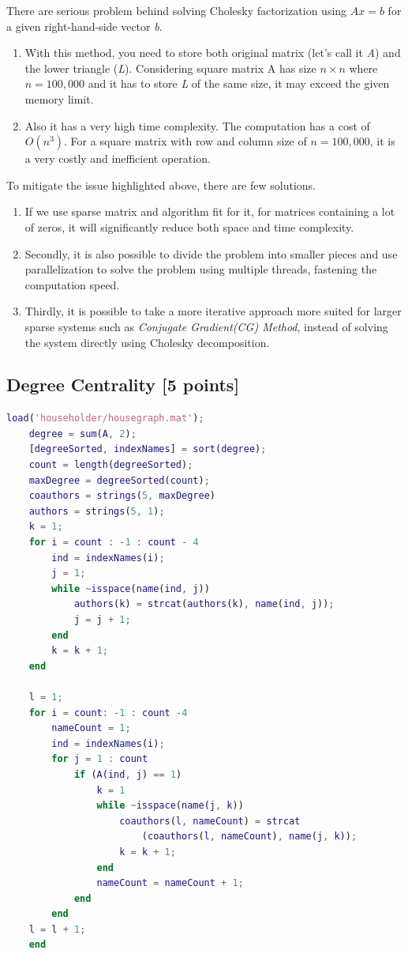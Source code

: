 \documentclass[unicode,11pt,a4paper,oneside,numbers=endperiod,openany]{scrartcl}
\begin{document}
\begin{enumerate}
{There are serious problem behind solving Cholesky factorization using $Ax = b$ for a given right-hand-side vector \textit{b}.}
\begin{enumerate}
 \item With this method, you need to store both original matrix (let's call it \textit{A}) and the lower triangle (\textit{L}). Considering square matrix A has size $n \times n$ where $n = 100,000$ and it has to store \textit{L} of the same size, it may exceed the given memory limit.
 \item Also it has a very high time complexity. The computation has a cost of $O(n^{3})$. For a square matrix with row and column size of $n = 100,000$, it is a very costly and inefficient operation.
\end{enumerate}

{To mitigate the issue highlighted above, there are few solutions.}
\begin{enumerate}
 \item If we use sparse matrix and algorithm fit for it, for matrices containing a lot of zeros, it will significantly reduce both space and time complexity.
 \item Secondly, it is also possible to divide the problem into smaller pieces and use parallelization to solve the problem using multiple threads, fastening the computation speed.
 \item Thirdly, it is possible to take a more iterative approach more suited for larger sparse systems such as \textit{Conjugate Gradient(CG) Method}, instead of solving the system directly using Cholesky decomposition.
\end{enumerate}
\end{enumerate}


\subsection{Degree Centrality [5 points]}
\begin{lstlisting}[language=Matlab]
    load('householder/housegraph.mat');
    degree = sum(A, 2);
    [degreeSorted, indexNames] = sort(degree);
    count = length(degreeSorted);
    maxDegree = degreeSorted(count);
    coauthors = strings(5, maxDegree)
    authors = strings(5, 1);
    k = 1;
    for i = count : -1 : count - 4 
        ind = indexNames(i);
        j = 1;
        while ~isspace(name(ind, j))
            authors(k) = strcat(authors(k), name(ind, j));
            j = j + 1;
        end
        k = k + 1;
    end
    
    l = 1;
    for i = count: -1 : count -4
        nameCount = 1;
        ind = indexNames(i);
        for j = 1 : count
            if (A(ind, j) == 1)
                k = 1
                while ~isspace(name(j, k))
                    coauthors(l, nameCount) = strcat
                        (coauthors(l, nameCount), name(j, k));
                    k = k + 1;
                end
                nameCount = nameCount + 1;
            end
        end
    l = l + 1;
    end
    
\end{lstlisting}
\end{document}
